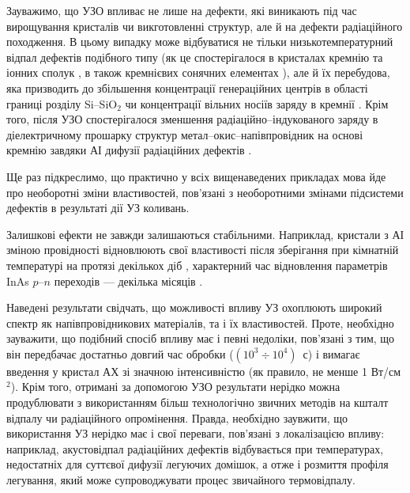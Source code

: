 Зауважимо, що УЗО впливає не лише на дефекти, які виникають під час вирощування кристалів чи викготовленні структур, але й на дефекти радіаційного походження.
В цьому випадку може відбуватися не тільки низькотемпературний відпал дефектів подібного типу (як це спостерігалося в кристалах кремнію \cite{PodolHivr} та іонних сполук \cite{UST:OstrovCsI}, в також кремнієвих сонячних елементах \cite{YOlikh2007TPLr}), але й їх перебудова, яка призводить до збільшення концентрації генераційних центрів в області границі розділу Si--SiO$_2$  \cite{Parchinskii2006r} чи концентрації вільних носіїв заряду в кремнії \cite{YOlikh2006TPLr}.
Крім того, після УЗО спостерігалося зменшення радіаційно--індукованого заряду в діелектричному прошарку структур метал--окис--напівпровідник на основі кремнію завдяки АІ дифузії радіаційних дефектів \cite{Parchinskii2000r}.

Ще раз підкреслимо, що практично у всіх вищенаведених прикладах мова йде про необоротні зміни властивостей,
пов'язані з необоротними змінами підсистеми дефектів в результаті дії УЗ коливань.


Залишкові ефекти не завжди залишаються стабільними.
Наприклад, кристали з АІ зміною провідності відновлюють свої властивості після зберігання при кімнатній температурі на протязі декількох діб \cite{YOlikh2006TPLr,US:ZnCdTe,BorkovFTT},
характерний час відновлення параметрів InAs $p$--$n$ переходів --- декілька місяців \cite{Teterkin2009r}.
  

Наведені результати свідчать, що можливості впливу УЗ охоплюють широкий спектр як напівпровідникових матеріалів, та і їх властивостей.
Проте, необхідно зауважити, що подібний спосіб впливу має і певні недоліки, пов'язані з тим, що він передбачає достатньо довгий час обробки ($(10^3\div10^4)$~с) і вимагає введення у кристал АХ зі значною інтенсивністю (як правило, не менше 1 Вт/см$^2$).
Крім того, отримані за допомогою УЗО результати нерідко можна продублювати з використанням більш технологічно звичних методів на кшталт відпалу чи радіаційного опромінення.
Правда, необхідно заувжити, що використання УЗ нерідко має і свої переваги, пов'язані з локалізацією впливу:
наприклад, акустовідпал радіаційних дефектів \cite{PodolHivr,UST:OstrovCsI,YOlikh2007TPLr} відбувається при температурах, недостатніх для суттєвої дифузії легуючих домішок, а отже і розмиття профіля легування, який може супроводжувати процес звичайного термовідпалу.



